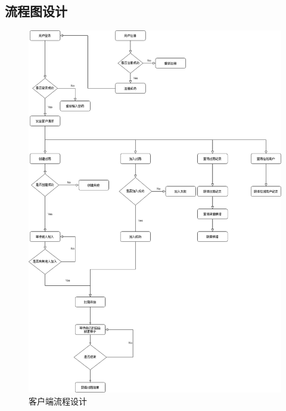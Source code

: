 \documentclass[utf8]{article}
\begin{document}
\subsection{流程图设计}
\newpage
\begin{figure}[H]
    \centering
    \includegraphics[width=\textwidth]{pictures/4}
    \caption{客户端流程设计}
\end{figure}
\newpage
\end{document}
